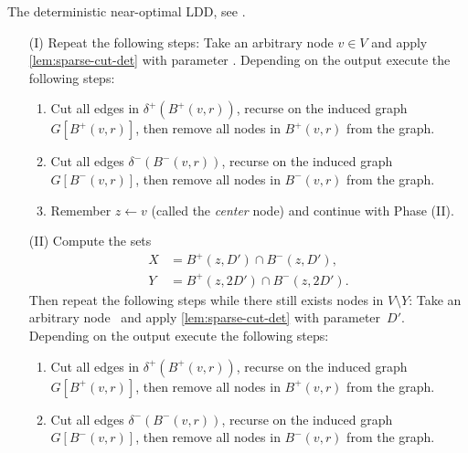 \begin{algorithm}[t]
	\caption{The deterministic near-optimal LDD, see .} \label{alg:det}
	\begin{enumerate}[label=\arabic*.]
		\item[(I)] Repeat the following steps: Take an arbitrary node $v \in V$ and apply \cref{lem:sparse-cut-det} with parameter . Depending on the output execute the following steps:
		\begin{enumerate}[label=(\roman*)]
			\item Cut all edges in $\delta^+(B^+(v, r))$, recurse on the induced graph $G[B^+(v, r)]$, then remove all nodes in $B^+(v, r)$ from the graph.
			\item Cut all edges $\delta^-(B^-(v, r))$, recurse on the induced graph $G[B^-(v, r)]$, then remove all nodes in $B^-(v, r)$ from the graph.
			\item Remember $z \gets v$ (called the \emph{center} node) and continue with Phase (II).
		\end{enumerate}
		\item[(II)] Compute the sets
		\begin{align*}
			X &= B^+(z, D') \cap B^-(z, D'), \\
			Y &= B^+(z, 2D') \cap B^-(z, 2D').
		\end{align*}
		Then repeat the following steps while there still exists nodes in $V \setminus Y$: Take an arbitrary node~ and apply \cref{lem:sparse-cut-det} with parameter~$D'$. Depending on the output execute the following steps:
		\begin{enumerate}[label=(\roman*)]
			\item Cut all edges in $\delta^+(B^+(v, r))$, recurse on the induced graph $G[B^+(v, r)]$, then remove all nodes in $B^+(v, r)$ from the graph.
			\item Cut all edges $\delta^-(B^-(v, r))$, recurse on the induced graph $G[B^-(v, r)]$, then remove all nodes in $B^-(v, r)$ from the graph.
		\end{enumerate}
	\end{enumerate}
\end{algorithm}

